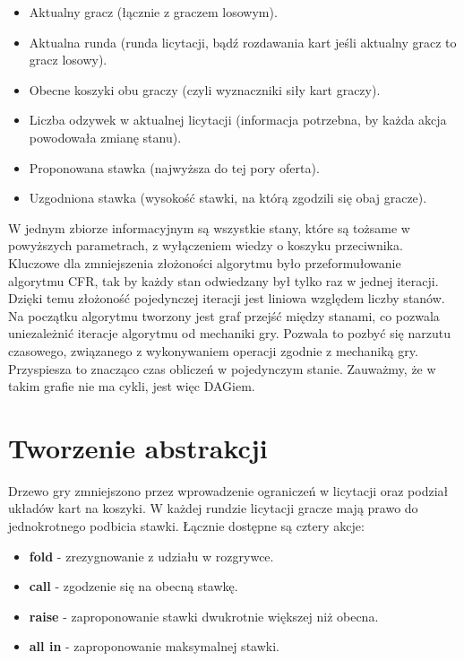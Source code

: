 \documentclass[licencjacka]{pracamgr}
\begin{document}
\begin{itemize}
\item Aktualny gracz (łącznie z graczem losowym).
\item Aktualna runda (runda licytacji, bądź rozdawania kart jeśli aktualny gracz to gracz losowy).
\item Obecne koszyki obu graczy (czyli wyznaczniki siły kart graczy).
\item Liczba odzywek w aktualnej licytacji (informacja potrzebna, by każda akcja powodowała zmianę stanu).
\item Proponowana stawka (najwyższa do tej pory oferta).
\item Uzgodniona stawka (wysokość stawki, na którą zgodzili się obaj gracze).
\end{itemize}

\noindent
W jednym zbiorze informacyjnym są wszystkie stany, które są tożsame w powyższych parametrach, z wyłączeniem
wiedzy o koszyku przeciwnika. \\

\noindent
Kluczowe dla zmniejszenia złożoności algorytmu było przeformułowanie algorytmu CFR, tak by każdy
stan odwiedzany był tylko raz w jednej iteracji. Dzięki temu złożoność pojedynczej iteracji jest
liniowa względem liczby stanów. Na początku algorytmu tworzony jest graf przejść między
stanami, co pozwala uniezależnić iteracje algorytmu od mechaniki gry. Pozwala to pozbyć się narzutu czasowego,
związanego z wykonywaniem operacji zgodnie z mechaniką gry. Przyspiesza to znacząco
czas obliczeń w pojedynczym stanie. Zauważmy, że w takim grafie nie ma cykli, jest więc DAGiem.

\section{Tworzenie abstrakcji}

Drzewo gry zmniejszono przez wprowadzenie ograniczeń w licytacji oraz podział układów kart na koszyki.
W każdej rundzie licytacji gracze mają prawo do jednokrotnego podbicia stawki. Łącznie dostępne są cztery akcje:

\begin{itemize}
\item \textbf{fold} - zrezygnowanie z udziału w rozgrywce.
\item \textbf{call} - zgodzenie się na obecną stawkę.
\item \textbf{raise} - zaproponowanie stawki dwukrotnie większej niż obecna.
\item \textbf{all in} - zaproponowanie maksymalnej stawki.
\end{itemize}
\end{document}
